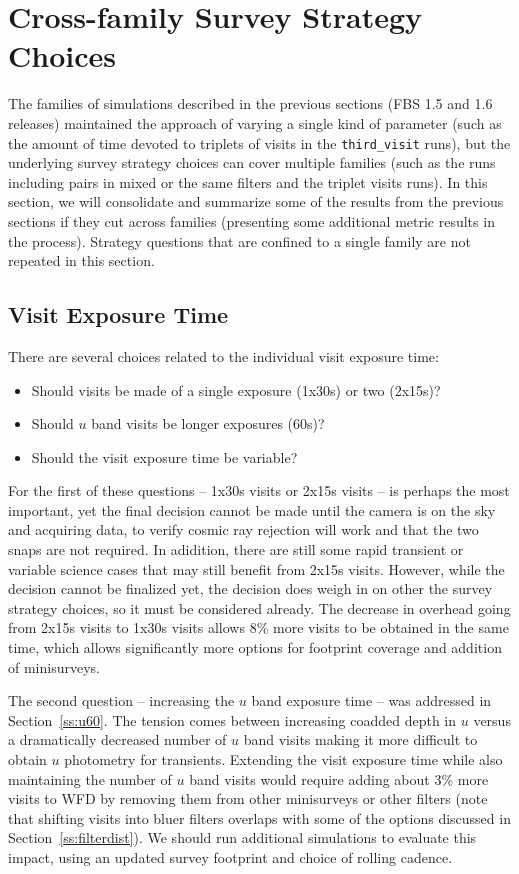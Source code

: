 \section{Cross-family Survey Strategy Choices}

The families of simulations described in the previous sections (FBS 1.5 and 1.6 releases) maintained the approach of varying a single kind of parameter (such as the amount of time devoted to triplets of visits in the {\tt third\_visit} runs), but the underlying survey strategy choices can cover multiple families (such as the runs including pairs in mixed or the same filters and the triplet visits runs). In this section, we will consolidate and summarize some of the results from the previous sections if they cut across families (presenting some additional metric results in the process). Strategy questions that are confined to a single family are not repeated in this section.

\subsection{Visit Exposure Time}\label{sec:visitexposuretime}

There are several choices related to the individual visit exposure time:
 \begin{itemize}
 \item Should visits be made of a single exposure (1x30s) or two (2x15s)? 
 \item Should $u$ band visits be longer exposures (60s)?
 \item Should the visit exposure time be variable?
 \end{itemize}
 
For the first of these questions -- 1x30s visits or 2x15s visits -- is perhaps the most important, yet the final decision cannot be made until the camera is on the sky and acquiring data, to verify cosmic ray rejection will work and that the two snaps are not required. In adidition, there are still some rapid transient or variable science cases that may still benefit from 2x15s visits. However, while the decision cannot be finalized yet, the decision does weigh in on other the survey strategy choices, so it must be considered already. The decrease in overhead going from 2x15s visits to 1x30s visits allows 8\% more visits to be obtained in the same time, which allows significantly more options for footprint coverage and addition of minisurveys. 

The second question -- increasing the $u$ band exposure time -- was addressed in Section~\ref{ss:u60}. The tension comes between increasing coadded depth in $u$ versus a dramatically decreased number of $u$ band visits making it more difficult to obtain $u$ photometry for transients. Extending the visit exposure time while also maintaining the number of $u$ band visits would require adding about 3\% more visits to WFD by removing them from other minisurveys or other filters (note that shifting visits into bluer filters overlaps with some of the options discussed in Section~\ref{ss:filterdist}). We should run additional simulations to evaluate this impact, using an updated survey footprint and choice of rolling cadence. 

